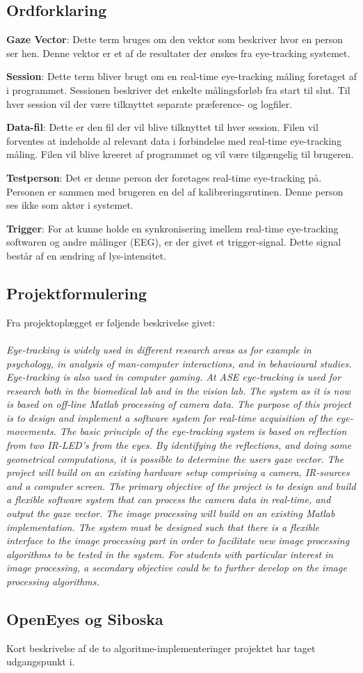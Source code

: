\documentclass[rapport.tex]{subfiles}
\begin{document}
	\subsection{Ordforklaring}
		\item \textbf{Gaze Vector}: Dette term bruges om den vektor som beskriver hvor en person ser hen. Denne vektor er et af de resultater der ønskes fra eye-tracking systemet.
		\item \textbf{Session}: Dette term bliver brugt om en real-time eye-tracking måling foretaget af i programmet. Sessionen beskriver det enkelte målingsforløb fra start til slut. Til hver session vil der være tilknyttet separate præference- og logfiler. 
		\item \textbf{Data-fil}: Dette er den fil der vil blive tilknyttet til hver session. Filen vil forventes at indeholde al relevant data i forbindelse med real-time eye-tracking måling. Filen vil blive kreeret af programmet og vil være tilgængelig til brugeren. 
		\item \textbf{Testperson}: Det er denne person der foretages real-time eye-tracking på. Personen er sammen med brugeren en del af kalibreringsrutinen. Denne person ses ikke som aktør i systemet. 
		\item \textbf{Trigger}: For at kunne holde en synkronisering imellem real-time eye-tracking softwaren og andre målinger (EEG), er der givet et trigger-signal. Dette signal består af en ændring af lys-intensitet. 
	\subsection{Projektformulering}
	Fra projektoplægget er føljende beskrivelse givet:\\
	\\
\textit{	Eye-tracking is widely used in different research areas as for example in psychology, in analysis of man-computer interactions, and in behavioural studies. Eye-tracking is also used in computer gaming. At ASE eye-tracking is used for research both in the biomedical lab and in the vision lab. The system as it is now is based on off-line Matlab processing of camera data. The purpose of this project is to design and implement a software system for real-time acquisition of the eye-movements. The basic principle of the eye-tracking system is based on reflection from two IR-LED’s from the eyes. By identifying the reflections, and doing some geometrical computations, it is possible to determine the users gaze vector. 
	The project will build on an existing hardware setup comprising a camera, IR-sources and a computer screen. The primary objective of the project is to design and build a flexible software system that can process the camera data in real-time, and output the gaze vector. The image processing will build on an existing Matlab implementation. The system must be designed such that there is a flexible interface to the image processing part in order to facilitate new image processing algorithms to be tested in the system. For students with particular interest in image processing, a secondary objective could be to further develop on the image processing algorithms.} 
	\\
	
	\subsection{OpenEyes og Siboska}
	Kort beskrivelse af de to algoritme-implementeringer projektet har taget udgangspunkt i.	
	
		
\end{document}
